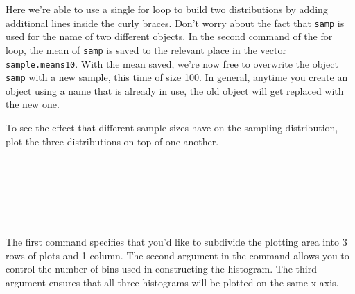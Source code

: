 \documentclass[11pt]{article}
\begin{document}
Here we're able to use a single for loop to build two distributions by adding additional lines inside the curly braces.  Don't worry about the fact that \texttt{samp} is used for the name of two different objects.  In the second command of the for loop, the mean of \texttt{samp} is saved to the relevant place in the vector \texttt{sample.means10}.  With the mean saved, we're now free to overwrite the object \texttt{samp} with a new sample, this time of size 100.  In general, anytime you create an object using a name that is already in use, the old object will get replaced with the new one.

To see the effect that different sample sizes have on the sampling distribution, plot the three distributions on top of one another.

\pagebreak

\ttfamily\noindent
\hlstd{}\hspace*{\fill}\\
\hlstd{}\hlkeyword{(}\hlargument{=}{\ }\hlkeyword{(}\hlkeyword{,}{\ }\hlkeyword{)}\hlkeyword{)}\hspace*{\fill}\\
\hlstd{}\hlkeyword{(}\hlkeyword{,}{\ }\hlargument{=}{\ }\hlkeyword{,}{\ }\hlargument{=}{\ }\hlkeyword{(}\hlkeyword{)}\hlkeyword{)}\hspace*{\fill}\\
\hlstd{}\hlkeyword{(}\hlkeyword{,}{\ }\hlargument{=}{\ }\hlkeyword{,}{\ }\hlargument{=}{\ }\hlkeyword{(}\hlkeyword{)}\hlkeyword{)}\hspace*{\fill}\\
\hlstd{}\hlkeyword{(}\hlkeyword{,}{\ }\hlargument{=}{\ }\hlkeyword{,}{\ }\hlargument{=}{\ }\hlkeyword{(}\hlkeyword{)}\hlkeyword{)}
\hlstd{}\hspace*{\fill}\\
\normalfont

The first command specifies that you'd like to subdivide the plotting area into 3 rows of plots and 1 column.  The second argument in the \texttt{} command allows you to control the number of bins used in constructing the histogram.  The third argument ensures that all three histograms will be plotted on the same x-axis.
\end{document}
